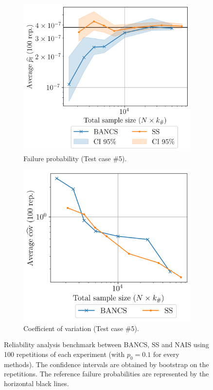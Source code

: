 \begin{figure}
    \begin{subfigure}[b]{0.49\linewidth}
        \centering
        \includegraphics[width=\linewidth]{part3/figures/BANCS/Oscillator_mean.png}
        \caption{Failure probability (Test case \#5).}
    \end{subfigure}
    \begin{subfigure}[b]{0.47\linewidth}
        \centering
        \includegraphics[width=\linewidth]{part3/figures/BANCS/Oscillator_cov.png}
        \caption{Coefficient of variation (Test case \#5).}
    \end{subfigure}
    \caption{Reliability analysis benchmark between BANCS, SS and NAIS using 100 repetitions of each experiment (with $p_0=0.1$ for every methods). 
                The confidence intervals are obtained by bootstrap on the repetitions. 
                The reference failure probabilities are represented by the horizontal black lines.}
    \label{fig:bancs_benchmark}
\end{figure}


